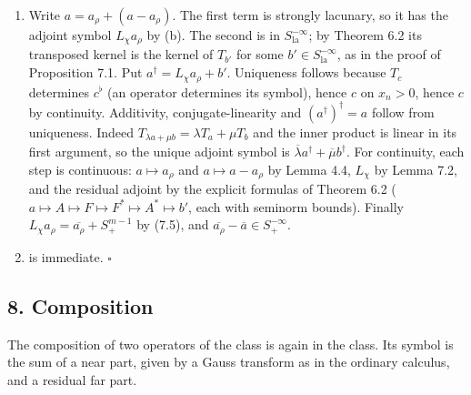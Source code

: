 \documentclass[
  11pt,
]{article}
\begin{document}
\begin{enumerate}
\def\labelenumi{(\alph{enumi})}
\item
  Write \(a=a_\rho+(a-a_\rho)\). The first term is strongly lacunary, so
  it has the adjoint symbol \(L_\chi a_\rho\) by (b). The second is in
  \(S^{-\infty}_{\mathrm{la}}\); by Theorem 6.2 its transposed kernel is
  the kernel of \(T_{b'}\) for some \(b'\in S^{-\infty}_{\mathrm{la}}\),
  as in the proof of Proposition 7.1. Put
  \(a^\dagger=L_\chi a_\rho+b'\). Uniqueness follows because \(T_c\)
  determines \(c^\flat\) (an operator determines its symbol), hence
  \(c\) on \(x_n>0\), hence \(c\) by continuity. Additivity,
  conjugate-linearity and \((a^\dagger)^\dagger=a\) follow from
  uniqueness. Indeed \(T_{\lambda a+\mu b}=\lambda T_a+\mu T_b\) and the
  inner product is linear in its first argument, so the unique adjoint
  symbol is \(\overline\lambda a^\dagger+\overline\mu b^\dagger\). For
  continuity, each step is continuous: \(a\mapsto a_\rho\) and
  \(a\mapsto a-a_\rho\) by Lemma 4.4, \(L_\chi\) by Lemma 7.2, and the
  residual adjoint by the explicit formulas of Theorem 6.2
  (\(a\mapsto A\mapsto F\mapsto F^*\mapsto A^*\mapsto b'\), each with
  seminorm bounds). Finally
  \(L_\chi a_\rho=\overline{a_\rho}+S^{m-1}_+\) by (7.5), and
  \(\overline{a_\rho}-\overline a\in S^{-\infty}_+\).
\item
  is immediate. \(\square\)
\end{enumerate}

\subsection{8. Composition}\label{composition}

The composition of two operators of the class is again in the class. Its
symbol is the sum of a near part, given by a Gauss transform as in the
ordinary calculus, and a residual far part.
\end{document}
